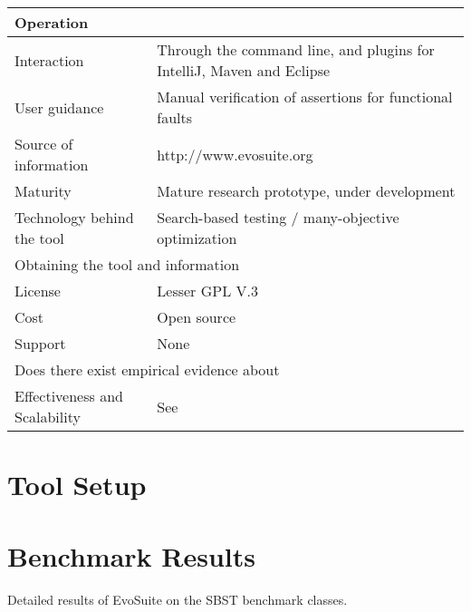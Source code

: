 \documentclass[sigconf]{acmart}
\newcommand{\EVOSUITE}{{\sc EvoSuite}\xspace}
\begin{document}
\begin{table}[!h]
{\begin{tabular}{|l|p{5cm}|}
  \hline
  \multicolumn{2}{|l|}{Operation} \\
  \hline
  Interaction &  Through the command line, and plugins for IntelliJ, Maven and Eclipse\\
  User guidance &  Manual verification of assertions for functional faults\\
  Source of information &  http://www.evosuite.org \\
  Maturity&  Mature research prototype, under development\\
  Technology behind the tool & Search-based testing / many-objective optimization \\
\hline
  \multicolumn{2}{|l|}{Obtaining the tool and information} \\
  \hline
License & Lesser GPL V.3\\
Cost & Open source\\
Support & None \\
\hline
\hline
  \multicolumn{2}{|l|}{Does there exist empirical evidence about} \\
  \hline
  Effectiveness and Scalability & See~\cite{GoA_TSE12,fraser2014large} \\
\hline
\end{tabular}\vspace{-1em}
}
\end{table}


\section{Tool Setup}

\section{Benchmark Results}


\begin{table*}[t]
  \centering
  \caption{\label{table:results}Detailed results of \EVOSUITE on the
    SBST benchmark classes.}
\vspace{-1em}
\resizebox{0.8\textwidth}{!}{  

}	
\end{table*}
\end{document}

